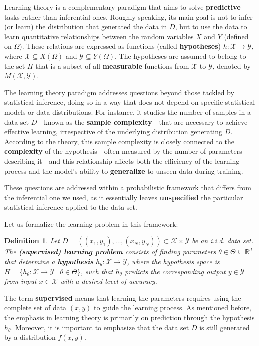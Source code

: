 \documentclass{report}
\newtheorem{definition}{Definition}[chapter]
\begin{document}
Learning theory is a complementary paradigm that aims to solve \textbf{predictive} tasks rather than inferential ones. Roughly speaking, its main goal is not to infer (or learn) the distribution that generated the data in $D$, but to use the data to learn quantitative relationships between the random variables $X$ and $Y$ (defined on $\Omega$). These relations are expressed as functions (called \textbf{hypotheses}) $h : \mathcal{X} \to \mathcal{Y}$, where $\mathcal{X} \subseteq X(\Omega)$ and $\mathcal{Y} \subseteq Y(\Omega)$. The hypotheses are assumed to belong to the set $H$ that is a subset of all \textbf{measurable} functions from $\mathcal{X}$ to $\mathcal{Y}$, denoted by $M(\mathcal{X}, \mathcal{Y})$.

The learning theory paradigm addresses questions beyond those tackled by statistical inference, doing so in a way that does not depend on specific statistical models or data distributions. For instance, it studies the number of samples in a data set $D$—known as the \textbf{sample complexity}—that are necessary to achieve effective learning, irrespective of the underlying distribution generating $D$. According to the theory, this sample complexity is closely connected to the \textbf{complexity} of the hypothesis—often measured by the number of parameters describing it—and this relationship affects both the efficiency of the learning process and the model's ability to \textbf{generalize} to unseen data during training.

These questions are addressed within a probabilistic framework that differs from the inferential one we used, as it essentially leaves \textbf{unspecified} the particular statistical inference applied to the data set.

Let us formalize the learning problem in this framework:

\begin{definition}
Let $D = ((x_1,y_1), \dots, (x_N,y_N)) \subset \mathcal{X} \times \mathcal{Y}$ be an i.i.d. data set. The \textbf{(supervised) learning problem} consists of finding parameters $\theta \in \Theta \subseteq \mathbb{R}^d$ that determine a \textbf{hypothesis} $h_\theta : \mathcal{X} \to \mathcal{Y}$, where the hypothesis space is $H = \{ h_\theta : \mathcal{X} \to \mathcal{Y} \mid \theta \in \Theta \}$, such that $h_\theta$ predicts the corresponding output $y \in \mathcal{Y}$ from input $x \in \mathcal{X}$ with a desired level of accuracy.
\end{definition}

The term \textbf{supervised} means that learning the parameters requires using the complete set of data $(x,y)$ to guide the learning process. As mentioned before, the emphasis in learning theory is primarily on prediction through the hypothesis $h_\theta$. Moreover, it is important to emphasize that the data set $D$ is still generated by a distribution $f(x,y)$.
\end{document}
